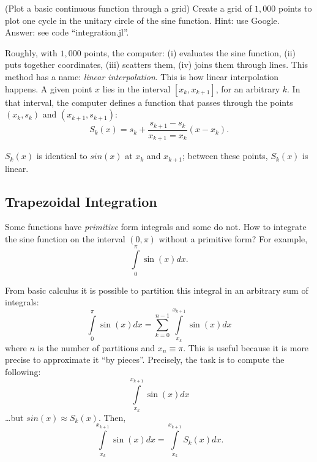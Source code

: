 \begin{exercise} (Plot a basic continuous function through a grid) \label{function:grid}
Create a grid of $1,000$ points to plot one cycle in the unitary circle of the sine function. Hint: use Google.\\
\noindent Answer: see code ``integration.jl''.
\end{exercise} 

\indent Roughly, with $1,000$ points, the computer: (i) evaluates the sine function, (ii) puts together coordinates, (iii) scatters them, (iv) joins them through lines. This method has a name: \emph{linear interpolation}. This is how linear interpolation happens. A given point $x$ lies in the interval $[x_{k},x_{k+1}]$, for an arbitrary $k$. In that interval, the computer defines a function that passes through the points $(x_{k},s_{k})$ and $(x_{k+1},s_{k+1})$:
\begin{equation}
S_{k}(x) = s_{k} + \frac{s_{k+1} - s_{k}}{x_{k+1} = x_{k}} (x - x_{k}). \label{eq:interpol}
\end{equation}

\noindent $S_{k}(x)$ is identical to $sin(x)$ at $x_{k}$ and $x_{k+1}$; between these points, $S_{k}(x)$ is linear.\\

\subsection{Trapezoidal Integration}
\indent Some functions have \emph{primitive} form integrals and some do not. How to integrate the sine function on the interval $(0,\pi)$ without a primitive form? For example,
\begin{equation}
\int \limits _{0} ^{\pi} \sin(x) dx. \label{eq:trap}
\end{equation} 

\indent From basic calculus it is possible to partition this integral in an arbitrary sum of integrals:
\begin{equation}
\int \limits _{0} ^{\pi} \sin(x)dx = \sum \limits _{k=0} ^{n-1} \int \limits _{x_{k}} ^{x_{k+1}} \sin(x)dx 
\end{equation}
\noindent where $n$ is the number of partitions and $x_{n} \equiv \pi$. This is useful because it is more precise to approximate it ``by pieces''. Precisely, the task is to compute the following:
\begin{equation}
\int \limits _{x_{k}} ^{x_{k+1}} \sin(x)dx 
\end{equation}
\noindent \ldots but $sin(x) \approx S_{k}(x)$. Then,
\begin{equation}
\int \limits _{x_{k}} ^{x_{k+1}} \sin(x)dx = \int \limits _{x_{k}} ^{x_{k+1}} S_{k}(x)dx. 
\end{equation}

